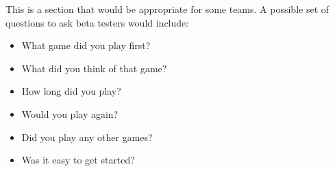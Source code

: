 \documentclass[12pt, titlepage]{article}
\begin{document}
This is a section that would be appropriate for some teams.
A possible set of questions to ask beta testers would include:
\begin{itemize}
    \item What game did you play first?
    \item What did you think of that game?
    \item How long did you play?
    \item Would you play again?
    \item Did you play any other games?
    \item Was it easy to get started?
\end{itemize}
\end{document}
